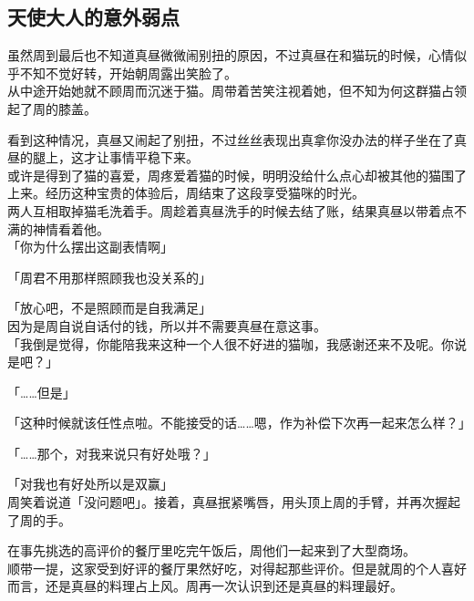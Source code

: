 \subsection{天使大人的意外弱点}

虽然周到最后也不知道真昼微微闹别扭的原因，不过真昼在和猫玩的时候，心情似乎不知不觉好转，开始朝周露出笑脸了。\\

从中途开始她就不顾周而沉迷于猫。周带着苦笑注视着她，但不知为何这群猫占领起了周的膝盖。

看到这种情况，真昼又闹起了别扭，不过丝丝表现出真拿你没办法的样子坐在了真昼的腿上，这才让事情平稳下来。\\

或许是得到了猫的喜爱，周疼爱着猫的时候，明明没给什么点心却被其他的猫围了上来。经历这种宝贵的体验后，周结束了这段享受猫咪的时光。\\

两人互相取掉猫毛洗着手。周趁着真昼洗手的时候去结了账，结果真昼以带着点不满的神情看着他。\\

「你为什么摆出这副表情啊」

「周君不用那样照顾我也没关系的」

「放心吧，不是照顾而是自我满足」\\

因为是周自说自话付的钱，所以并不需要真昼在意这事。\\

「我倒是觉得，你能陪我来这种一个人很不好进的猫咖，我感谢还来不及呢。你说是吧？」

「……但是」

「这种时候就该任性点啦。不能接受的话……嗯，作为补偿下次再一起来怎么样？」

「……那个，对我来说只有好处哦？」

「对我也有好处所以是双赢」\\

周笑着说道「没问题吧」。接着，真昼抿紧嘴唇，用头顶上周的手臂，并再次握起了周的手。\\

\vspace{2\baselineskip}

在事先挑选的高评价的餐厅里吃完午饭后，周他们一起来到了大型商场。\\

顺带一提，这家受到好评的餐厅果然好吃，对得起那些评价。但是就周的个人喜好而言，还是真昼的料理占上风。周再一次认识到还是真昼的料理最好。\\

